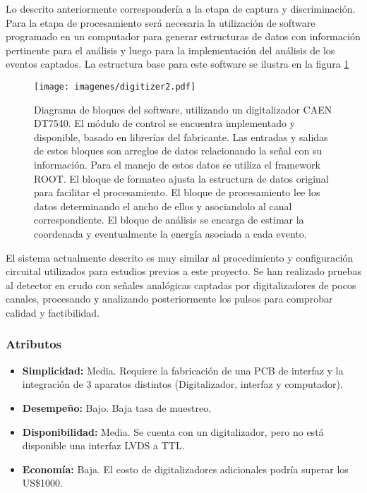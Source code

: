 \par Lo descrito anteriormente correspondería a la etapa de captura y discriminación. Para la etapa de procesamiento será necesaria la utilización de software programado en un computador para generar estructuras de datos con información pertinente para el análisis y luego para la implementación del análisis de los eventos captados. La estructura base para este software se ilustra en la figura \ref{fig:digitizer2}

\begin{figure}[H]
    \centering
    \texttt{[image: imagenes/digitizer2.pdf]}
    \caption{Diagrama de bloques del software, utilizando un digitalizador CAEN DT7540. El módulo de control se encuentra implementado y disponible, basado en librerías del fabricante. Las entradas y salidas de estos bloques son arreglos de datos relacionando la señal con su información. Para el manejo de estos datos se utiliza el framework ROOT\cite{CERN2020ROOT:Framework}. El bloque de formateo ajusta la estructura de datos original para facilitar el procesamiento. El bloque de procesamiento lee los datos determinando el ancho de ellos y asociandolo al canal correspondiente. El bloque de análisis se encarga de estimar la coordenada y eventualmente la energía asociada a cada evento.}
    \label{fig:digitizer2}
\end{figure}


\par El sistema actualmente descrito es muy similar al procedimiento y configuración circuital utilizados para estudios previos a este proyecto. Se han realizado pruebas al detector en crudo con señales analógicas captadas por digitalizadores de pocos canales, procesando y analizando posteriormente los pulsos para comprobar calidad y factibilidad.

\subsubsection*{Atributos}
\begin{itemize}
    \item \textbf{Simplicidad:} Media. Requiere la fabricación de una PCB de interfaz y la integración de 3 aparatos distintos (Digitalizador, interfaz y computador).
    \item \textbf{Desempeño:} Bajo. Baja tasa de muestreo.
    \item \textbf{Disponibilidad:} Media. Se cuenta con un digitalizador, pero no está disponible una interfaz LVDS a TTL.
    \item \textbf{Economía:} Baja. El costo de digitalizadores adicionales podría superar los US\$1000.
\end{itemize}

